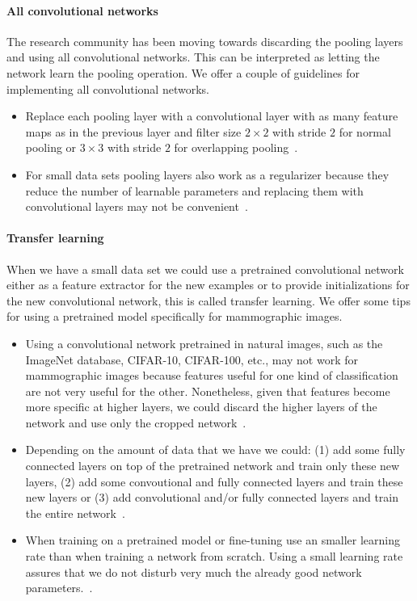 \paragraph{All convolutional networks}
The research community has been moving towards discarding the pooling layers and using all convolutional networks. This can be interpreted as letting the network learn the pooling operation. We offer a couple of guidelines for implementing all convolutional networks.  
\begin{itemize}
	\item Replace each pooling layer with a convolutional layer with as many feature maps as in the previous layer and filter size $2\times 2$ with stride $2$ for normal pooling or $3\times 3$ with stride $2$ for overlapping pooling~\cite{Springenberg2014}. 

	\item For small data sets pooling layers also work as a regularizer because they reduce the number of learnable parameters and replacing them with convolutional layers may not be convenient~\cite{Karpathy2015}.
\end{itemize}

\paragraph{Transfer learning}
When we have a small data set we could use a pretrained convolutional network either as a feature extractor for the new examples or to provide initializations for the new convolutional network, this is called transfer learning. We offer some tips for using a pretrained model specifically for mammographic images.

\begin{itemize}
	\item Using a convolutional network pretrained in natural images, such as the ImageNet database, CIFAR-10, CIFAR-100, etc., may not work for mammographic images because features useful for one kind of classification are not very useful for the other. Nonetheless, given that features become more specific at higher layers, we could discard the higher layers of the network and use only the cropped network~\cite{Karpathy2015}.
 
	\item Depending on the amount of data that we have we could: (1) add some fully connected layers on top of the pretrained network and train only these new layers, (2) add some convoutional and fully connected layers and train these new layers or (3) add convolutional and/or fully connected layers and train the entire network~\cite{Karpathy2015}.

	\item When training on a pretrained model or fine-tuning use an smaller learning rate than when training a network from scratch. Using a small learning rate assures that we do not disturb very much the already good network parameters.~\cite{Karpathy2015}.
\end{itemize}

